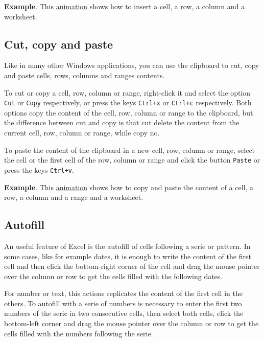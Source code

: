 \textbf{Example}.  This \href{http://aprendeconalf.es/office/excel/manual/img/example_data_insert.gif}{animation} shows how to insert a cell, a row, a column and a worksheet.

\subsection{Cut, copy and paste}\hypertarget{cut-copy-and-paste}{}\label{cut-copy-and-paste}

Like in many other Windows applications, you can use the clipboard to cut, copy and paste cells, rows, columns and ranges contents.

To cut or copy a cell, row, column or range, right-click it and select the option \texttt{Cut} or \texttt{Copy} respectively, or press the keys \texttt{Ctrl+x} or \texttt{Ctrl+c} respectively. Both options copy the content of the cell, row, column or range to the clipboard, but the difference between cut and copy is that cut delete the content from the current cell, row, column or range, while copy no.

To paste the content of the clipboard in a new cell, row, column or range, select the cell or the first cell of the row, column or range and click the button \texttt{Paste} or press the keys \texttt{Ctrl+v}.

\textbf{Example}.  This \href{http://aprendeconalf.es/office/excel/manual/img/example_copy_paste.gif}{animation} shows how to copy and paste the content of a cell, a row, a column and a range and a worksheet.

\subsection{Autofill}\hypertarget{autofill}{}\label{autofill}

An useful feature of Excel is the autofill of cells following a serie or pattern. In some cases, like for example dates, it is enough to write the content of the first cell and then click the bottom-right corner of the cell and drag the mouse pointer over the column or row to get the cells filled with the following dates.

For number or text, this actions replicates the content of the first cell in the others. To autofill with a serie of numbers is necessary to enter the first two numbers of the serie in two consecutive cells, then select both cells, click the bottom-left corner and drag the mouse pointer over the column or row to get the cells filled with the numbers following the serie.

